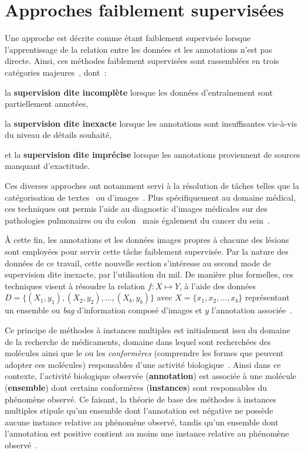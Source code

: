 \section{Approches faiblement supervisées}
\label{sec:patient_decision_weak}
Une approche est décrite comme étant faiblement supervisée lorsque l'apprentissage de la relation entre les données et les annotations n'est pas directe. Ainsi, ces méthodes faiblement supervisées sont rassemblées en trois catégories majeures~\cite{Zhou2018}, dont~:
\begin{inlinerate}
    \item la \textbf{supervision dite incomplète} lorsque les données d'entraînement sont partiellement annotées,
    \item la \textbf{supervision dite inexacte} lorsque les annotations sont insuffisantes vis-à-vis du niveau de détails souhaité,
    \item et la \textbf{supervision dite imprécise} lorsque les annotations proviennent de sources manquant d'exactitude.
\end{inlinerate} Ces diverses approches ont notamment servi à la résolution de tâches telles que la catégorisation de textes~\cite{Andrews2003,Settles2008} ou d'images~\cite{Chen2004,Tang2009}. Plus spécifiquement au domaine médical, ces techniques ont permis l'aide au diagnostic d'images médicales sur des pathologies pulmonaires ou du colon~\cite{Dundar2007} mais également du cancer du sein~\cite{Sudharshan2019}.\par

À cette fin, les annotations et les données images propres à chacune des lésions sont employées pour servir cette tâche faiblement supervisée. Par la nature des données de ce travail, cette nouvelle section s'intéresse au second mode de supervision dite inexacte, par l'utilisation du \acrfull{mil}. De manière plus formelles, ces techniques visent à résoudre la relation $f: X \mapsto Y$, à l'aide des données $D=\{(X_1,y_1),(X_2,y_2),\ldots,(X_b,y_b)\}$ avec $X=\{x_1,x_2,\ldots,x_b\}$ représentant un ensemble ou \textit{bag} d'information composé d'images et $y$ l'annotation associée~\cite{foulds2010}.\par

Ce principe de méthodes à instances multiples est initialement issu du domaine de la recherche de médicaments, domaine dans lequel sont recherchées des molécules ainsi que le ou les \textit{conformères} (comprendre les formes que peuvent adopter ces molécules) responsables d'une activité biologique~\cite{Dietterich1997}. Ainsi dans ce contexte, l'activité biologique observée (\textbf{annotation}) est associée à une molécule (\textbf{ensemble}) dont certains conformères (\textbf{instances}) sont responsables du phénomène observé. Ce faisant, la théorie de base des méthodes à instances multiples stipule qu'un ensemble dont l'annotation est négative ne possède aucune instance relative au phénomène observé, tandis qu'un ensemble dont l'annotation est positive contient au moins une instance relative au phénomène observé~\cite{Dietterich1997}.\par

